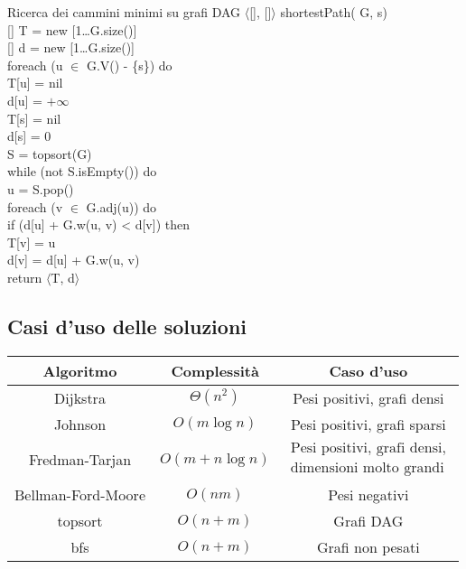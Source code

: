 \newpage
\begin{minicode}{Ricerca dei cammini minimi su grafi DAG}
\ind$\langle$[], []$\rangle$ shortestPath( G,  s)\\
    [] T = new [1\dots G.size()]\\
    [] d = new [1\dots G.size()]\\

    \indf foreach (u $\in$ G.V() - \{s\}) do\\
        T[u] = nil\\
        d[u] = $+\infty$\\
    \indf T[s] = nil\\
    \indf d[s] = 0\\
    \indf{} S = topsort(G)\\

    \indf while (not S.isEmpty()) do\\
         u = S.pop()\\
        \indff foreach (v $\in$ G.adj(u)) do\\
            \indfff if (d[u] + G.w(u, v) < d[v]) then\\
                T[v] = u\\
                d[v] = d[u] + G.w(u, v)\\
    \indf return $\langle$T, d$\rangle$
\end{minicode}

\subsection{Casi d'uso delle soluzioni}
\begin{table}[h!]
    \centering
    \renewcommand{\arraystretch}{1.2}
    \begin{tabular}{|c|c|c|}
        \hline
        \textbf{Algoritmo} & \textbf{Complessità} & \textbf{Caso d'uso}\\
        \hline
        Dijkstra & $\Theta(n^2)$ & Pesi positivi, grafi densi\\
        \hline
        Johnson & $O(m\log n)$ & Pesi positivi, grafi sparsi\\
        \hline
        Fredman-Tarjan & $O(m+n\log n)$ & $\begin{array}{l}
            \text{Pesi positivi, grafi densi,}\\
            \text{dimensioni molto grandi}
        \end{array}$\\
        \hline
        Bellman-Ford-Moore & $O(nm)$ & Pesi negativi\\
        \hline
        topsort & $O(n+m)$ & Grafi DAG\\
        \hline
        bfs & $O(n+m)$ & Grafi non pesati\\
        \hline
    \end{tabular}
\end{table}

